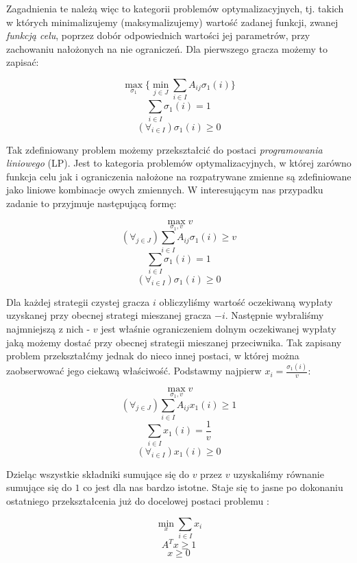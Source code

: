 \documentclass[polish]{standalone}
\begin{document}
Zagadnienia te należą więc to kategorii problemów optymalizacyjnych, tj. takich w których minimalizujemy
(maksymalizujemy) wartość zadanej funkcji, zwanej \textit{funkcją celu}, poprzez dobór odpowiednich wartości jej
parametrów, przy zachowaniu nałożonych na nie ograniczeń. \cite[str.~41]{O-GT} Dla pierwszego gracza możemy to zapisać:

$$\max_{\sigma_1} \{ \min_{j \in J} \sum_{i \in I} A_{ij} \sigma_1(i) \}$$
$$\sum_{i \in I} \sigma_1(i) = 1$$
$$(\forall_{i \in I}) \sigma_1(i) \geq 0$$

Tak zdefiniowany problem możemy przekształcić do postaci \textit{programowania liniowego}
(LP). \cite[str.~62]{O-GT} Jest to kategoria problemów optymalizacyjnych, w której zarówno funkcja celu jak
i ograniczenia nałożone na rozpatrywane zmienne są zdefiniowane jako liniowe kombinacje owych zmiennych. W
interesującym nas przypadku zadanie to przyjmuje następującą formę:

$$\max_{\sigma_1,v} v$$
$$(\forall_{j \in J}) \sum_{i \in I} A_{ij} \sigma_1(i) \geq v$$
$$\sum_{i \in I} \sigma_1(i) = 1$$
$$(\forall_{i \in I}) \sigma_1(i) \geq 0$$

Dla każdej strategii czystej gracza $i$ obliczyliśmy wartość oczekiwaną wypłaty uzyskanej przy obecnej strategi
mieszanej gracza $-i$. Następnie wybraliśmy najmniejszą z nich - $v$ jest właśnie ograniczeniem dolnym oczekiwanej
wypłaty jaką możemy dostać przy obecnej strategii mieszanej przeciwnika. Tak zapisany problem przekształćmy jednak do
nieco innej postaci, w której można zaobserwować jego ciekawą właściwość. Podstawmy najpierw $x_i = 
\frac{\sigma_1(i)}{v}$:

$$\max_{\sigma_1,v} v$$
\begin{equation}
(\forall_{j \in J}) \sum_{i \in I} A_{ij} x_1(i) \geq 1 \label{MTRX1a}
\end{equation}
\begin{equation}
\sum_{i \in I} x_1(i) = \frac{1}{v} \label{MTRX1b}
\end{equation}
\begin{equation}
(\forall_{i \in I}) x_1(i) \geq 0 \label{MTRX1c}
\end{equation}

Dzieląc wszystkie składniki sumujące się do $v$ przez $v$ uzyskaliśmy równanie sumujące się do $1$ co jest dla nas
bardzo istotne. Staje się to jasne po dokonaniu ostatniego przekształcenia już do docelowej postaci problemu
\cite[str.~63]{O-GT}:

$$\min_x \sum_{i \in I} x_i$$
\begin{equation}
A^Tx \geq 1 \label{MTRX2a}
\end{equation}
\begin{equation}
x \geq 0 \label{MTRX2b}
\end{equation}
\end{document}
